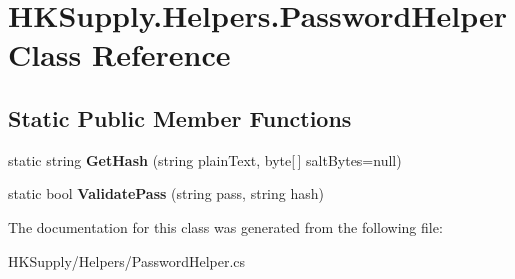 \hypertarget{class_h_k_supply_1_1_helpers_1_1_password_helper}{}\section{H\+K\+Supply.\+Helpers.\+Password\+Helper Class Reference}
\label{class_h_k_supply_1_1_helpers_1_1_password_helper}
\subsection*{Static Public Member Functions}
\begin{DoxyCompactItemize}
\item 
\mbox{\label{class_h_k_supply_1_1_helpers_1_1_password_helper_aeaf390a6e70bd83cc7eb210d3d07a89d}} 
static string {\bfseries Get\+Hash} (string plain\+Text, byte\mbox{[}$\,$\mbox{]} salt\+Bytes=null)
\item 
\mbox{\label{class_h_k_supply_1_1_helpers_1_1_password_helper_aeb64d915984f589049e1a3fa9eb91042}} 
static bool {\bfseries Validate\+Pass} (string pass, string hash)
\end{DoxyCompactItemize}


The documentation for this class was generated from the following file\+:\begin{DoxyCompactItemize}
\item 
H\+K\+Supply/\+Helpers/Password\+Helper.\+cs\end{DoxyCompactItemize}
